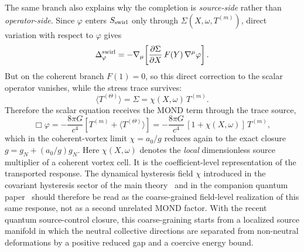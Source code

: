 \documentclass[11pt]{article}
\begin{document}
The same branch also explains why the completion is \emph{source-side} rather
than \emph{operator-side}. Since $\varphi$ enters $S_{\rm swirl}$ only through
$\Sigma(X,\omega,T^{(m)})$, direct variation with respect to $\varphi$ gives
\[
\Delta_\varphi^{\rm swirl}
= -\nabla_\mu\!\left[
\frac{\partial\Sigma}{\partial X}\,F(Y)\,\nabla^\mu\varphi
\right].
\]
But on the coherent branch $F(1)=0$, so this direct correction to the scalar
operator vanishes, while the stress trace survives:
\[
\langle T^{(\Theta)}\rangle
= \Sigma
= \chi(X,\omega)\,T^{(m)}.
\]
Therefore the scalar equation receives the MOND term through the trace source,
\[
\Box\varphi
= -\frac{8\pi G}{c^4}
\left[T^{(m)}+\langle T^{(\Theta)}\rangle\right]
= -\frac{8\pi G}{c^4}\,[1+\chi(X,\omega)]\,T^{(m)},
\]
which in the coherent-vortex limit $\chi=a_0/g$ reduces again to the exact
closure $g=g_N+(a_0/g)g_N$.
Here $\chi(X,\omega)$ denotes the \emph{local} dimensionless source multiplier of a coherent vortex cell. It is the coefficient-level representation of the transported response. The dynamical hysteresis field $\chi$ introduced in the covariant hysteresis sector of the main theory~\cite{Lotishvili2026} and in the companion quantum paper~\cite{Lotishvili2026Q} should therefore be read as the coarse-grained field-level realization of this same response, not as a second unrelated MOND factor.  With the recent quantum source-control closure, this coarse-graining starts from a localized source manifold in which the neutral collective directions are separated from non-neutral deformations by a positive reduced gap and a coercive energy bound.
\end{document}
